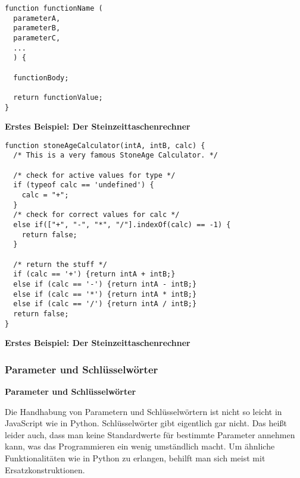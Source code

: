 \begin{verbatim}
function functionName (
  parameterA,
  parameterB,
  parameterC,
  ...
  ) {

  functionBody;

  return functionValue;
}
\end{verbatim}

\vspace{0.5cm}\par\noindent\textbf{Erstes Beispiel: Der Steinzeittaschenrechner}\vspace{0.5cm}

\begin{verbatim}
function stoneAgeCalculator(intA, intB, calc) {
  /* This is a very famous StoneAge Calculator. */

  /* check for active values for type */
  if (typeof calc == 'undefined') {
    calc = "+";
  }
  /* check for correct values for calc */
  else if(["+", "-", "*", "/"].indexOf(calc) == -1) {
    return false;
  }

  /* return the stuff */
  if (calc == '+') {return intA + intB;}
  else if (calc == '-') {return intA - intB;}
  else if (calc == '*') {return intA * intB;}
  else if (calc == '/') {return intA / intB;}
  return false;
}
\end{verbatim}




\vspace{0.5cm}\par\noindent\textbf{Erstes Beispiel: Der Steinzeittaschenrechner}\vspace{0.5cm}



\subsubsection{\texorpdfstring{{Parameter und
Schlüsselwörter}}{Parameter und Schlüsselwörter}}

\vspace{0.5cm}\par\noindent\textbf{Parameter und Schlüsselwörter}\vspace{0.5cm}

Die Handhabung von Parametern und Schlüsselwörtern ist nicht so leicht
in JavaScript wie in Python. Schlüsselwörter gibt eigentlich gar nicht.
Das heißt leider auch, dass man keine Standardwerte für bestimmte
Parameter annehmen kann, was das Programmieren ein wenig umständlich
macht. Um ähnliche Funktionalitäten wie in Python zu erlangen, behilft
man sich meist mit Ersatzkonstruktionen.





